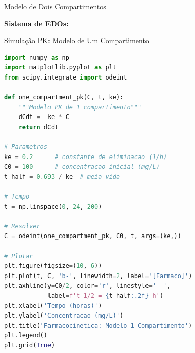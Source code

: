 \begin{frame}{Modelo de Dois Compartimentos}
\begin{center}
\end{center}

\textbf{Sistema de EDOs:}
\end{frame}

\begin{frame}[fragile]{Simulação PK: Modelo de Um Compartimento}
\begin{lstlisting}[language=Python, caption=Farmacocinética monocompartimental, basicstyle=\ttfamily\footnotesize]
import numpy as np
import matplotlib.pyplot as plt
from scipy.integrate import odeint

def one_compartment_pk(C, t, ke):
    """Modelo PK de 1 compartimento"""
    dCdt = -ke * C
    return dCdt

# Parametros
ke = 0.2      # constante de eliminacao (1/h)
C0 = 100      # concentracao inicial (mg/L)
t_half = 0.693 / ke  # meia-vida

# Tempo
t = np.linspace(0, 24, 200)

# Resolver
C = odeint(one_compartment_pk, C0, t, args=(ke,))

# Plotar
plt.figure(figsize=(10, 6))
plt.plot(t, C, 'b-', linewidth=2, label='[Farmaco]')
plt.axhline(y=C0/2, color='r', linestyle='--',
            label=f't_1/2 = {t_half:.2f} h')
plt.xlabel('Tempo (horas)')
plt.ylabel('Concentracao (mg/L)')
plt.title('Farmacocinetica: Modelo 1-Compartimento')
plt.legend()
plt.grid(True)
\end{lstlisting}
\end{frame}

